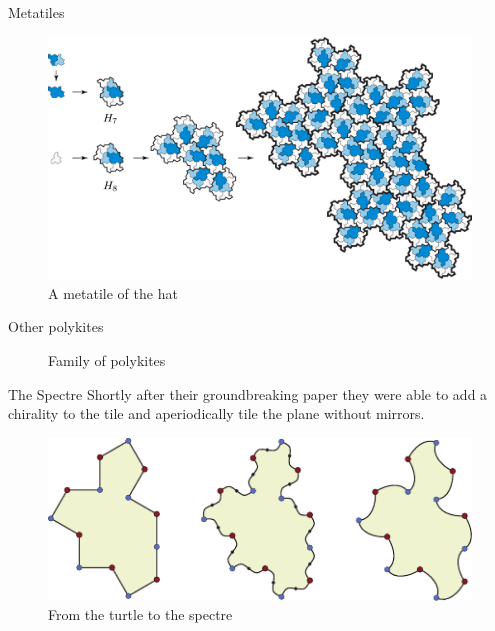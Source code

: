 \documentclass{beamer}
\begin{document}
    

\begin{frame}{Metatiles}
    \begin{figure}
        \centering
        \includegraphics[page=1,width=\textwidth]{images/aperiodic-pdfs/alt_subst.pdf}
        \caption{A metatile of the hat}
        \label{fig:hat-metatile}
    \end{figure}
\end{frame}

\begin{frame}{Other polykites}
    \begin{figure}
        \centering
        
        \caption{Family of polykites}
        \label{fig:other-polykites}
    \end{figure}
\end{frame}

\begin{frame}{The Spectre}
    Shortly after their groundbreaking paper they were able to add a chirality to the tile and aperiodically tile the plane without mirrors. \cite{Smith_2024_chiral}
    \begin{figure}
        \centering
        \includegraphics[width=\linewidth]{images/aperiodic-pdfs/polygon_to_spectre.pdf}
        \caption{From the turtle to the spectre}
        \label{fig:turle-spectra}
    \end{figure}
\end{frame}
\end{document}
